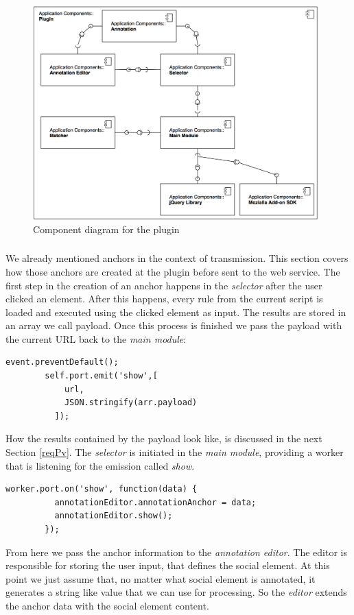\begin{figure}
	\includegraphics[width=11cm]{images/component-plugin-diagram.png}
	\caption{Component diagram for the plugin}
	\label{component-plugin-diagram}
\end{figure}

\subsubsection[Creating Anchors]{\reqPiv}\label{reqPiv}
We already mentioned anchors in the context of transmission. This section covers how those anchors are created at the plugin before sent to the web service. 
The first step in the creation of an anchor happens in the \emph{selector} after the user clicked an element. After this happens, every rule from the current script is loaded and executed using the clicked element as input. The results are stored in an array we call payload. Once this process is finished we pass the payload with the current URL back to the \emph{main module}:

\begin{lstlisting}
event.preventDefault();    
        self.port.emit('show',[
            url,
            JSON.stringify(arr.payload)
          ]);
\end{lstlisting}
How the results contained by the payload look like, is discussed in the next Section \ref{reqPv}. 
The \textit{selector} is initiated in the \textit{main module}, providing a worker that is listening for the emission called \textit{show}. 
\begin{lstlisting}
worker.port.on('show', function(data) {
          annotationEditor.annotationAnchor = data;
          annotationEditor.show();
        });
\end{lstlisting}
From here we pass the anchor information to the \textit{annotation editor}. The editor is responsible for storing the user input, that defines the social element. At this point we just assume that, no matter what social element is annotated, it generates a string like value that we can use for processing. So the \textit{editor} extends the anchor data with the social element content. 

